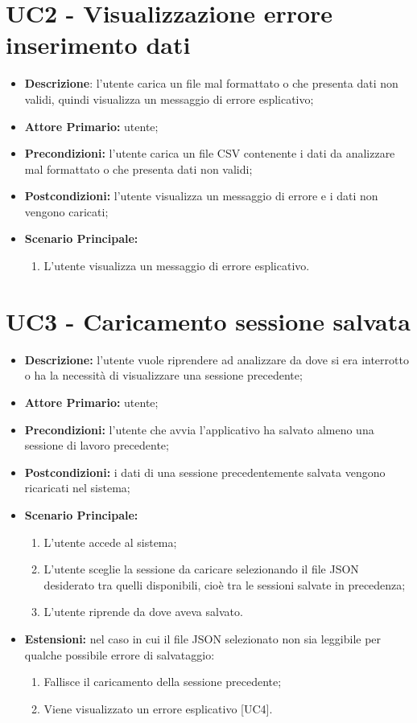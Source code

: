 \section{UC2 - Visualizzazione errore inserimento dati}
\begin{itemize}
  \item \textbf{Descrizione}: l'utente carica un file mal formattato o che presenta dati non validi, quindi visualizza un messaggio di errore esplicativo;
  \item \textbf{Attore Primario:} utente;
  \item \textbf{Precondizioni:} l’utente carica un file CSV contenente i dati da analizzare mal formattato o che presenta dati non validi;
  \item \textbf{Postcondizioni:} l'utente visualizza un messaggio di errore e i dati non vengono caricati;
  \item \textbf{Scenario Principale:}
  \begin{enumerate}
    \item L'utente visualizza un messaggio di errore esplicativo.
  \end{enumerate}
\end{itemize}

\section{UC3 - Caricamento sessione salvata}
\begin{itemize}
  \item \textbf{Descrizione:} l'utente vuole riprendere ad analizzare da dove si era interrotto o ha la necessità di visualizzare una sessione precedente;
  \item \textbf{Attore Primario:} utente;
  \item \textbf{Precondizioni:} l'utente che avvia l'applicativo ha salvato almeno una sessione di lavoro precedente;
  \item \textbf{Postcondizioni:} i dati di una sessione precedentemente salvata vengono ricaricati nel sistema;
  \item \textbf{Scenario Principale:}
  \begin{enumerate}
    \item L'utente accede al sistema;
    \item L'utente sceglie la sessione da caricare selezionando il file JSON desiderato tra quelli disponibili,
    cioè tra le sessioni salvate in precedenza;
    \item L'utente riprende da dove aveva salvato.
  \end{enumerate}
  \item \textbf{Estensioni:} nel caso in cui il file JSON selezionato non sia leggibile per qualche possibile errore di salvataggio:
    \begin{enumerate}
      \item Fallisce il caricamento della sessione precedente;
      \item Viene visualizzato un errore esplicativo [UC4].
    \end{enumerate}
\end{itemize}

